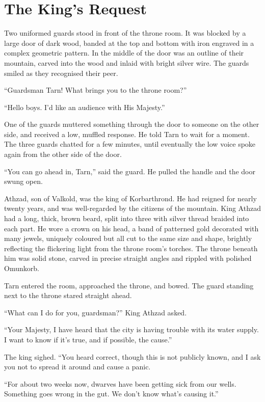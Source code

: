 \chapter{The King's Request}

Two uniformed guards stood in front of the throne room.  It was blocked by a large door of dark wood, banded at the top and bottom with iron engraved in a complex geometric pattern.  In the middle of the door was an outline of their mountain, carved into the wood and inlaid with bright silver wire.  The guards smiled as they recognised their peer.

``Guardsman Tarn!  What brings you to the throne room?''

``Hello boys.  I'd like an audience with His Majesty.''

One of the guards muttered something through the door to someone on the other side, and received a low, muffled response.  He told Tarn to wait for a moment.  The three guards chatted for a few minutes, until eventually the low voice spoke again from the other side of the door.

``You can go ahead in, Tarn,'' said the guard.  He pulled the handle and the door swung open.

Athzad, son of Valkold, was the king of Korbarthrond.  He had reigned for nearly twenty years, and was well-regarded by the citizens of the mountain.  King Athzad had a long, thick, brown beard, split into three with silver thread braided into each part.  He wore a crown on his head, a band of patterned gold decorated with many jewels, uniquely coloured but all cut to the same size and shape, brightly reflecting the flickering light from the throne room's torches.  The throne beneath him was solid stone, carved in precise straight angles and rippled with polished Omunkorb.

Tarn entered the room, approached the throne, and bowed.  The guard standing next to the throne stared straight ahead.

``What can I do for you, guardsman?'' King Athzad asked.

``Your Majesty, I have heard that the city is having trouble with its water supply.  I want to know if it's true, and if possible, the cause.''

The king sighed.  ``You heard correct, though this is not publicly known, and I ask you not to spread it around and cause a panic.

``For about two weeks now, dwarves have been getting sick from our wells.  Something goes wrong in the gut.  We don't know what's causing it.''

